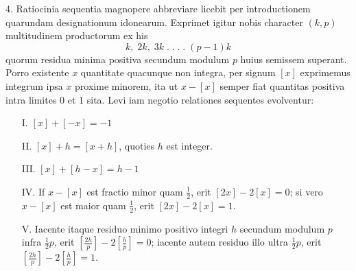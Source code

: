 \documentclass[14pt]{memoir}
\begin{document}
4. 
Ratiocinia sequentia magnopere abbreviare licebit per introductionem quarundam designationum idonearum. Exprimet igitur nobis character \((k, p)\) multitudinem productorum ex his 
\[ k,\;2k,\;3k\;.\;.\;.\;.\;(p-1)k \]
quorum residua minima positiva secundum modulum \(p\) huius semissem superant. Porro existente \(x\) quantitate quacunque non integra, per signum \([x]\) exprimemus integrum ipsa \(x\) proxime minorem, ita ut \(x-[x]\) semper fiat quantitas positiva intra limites \(0\) et \(1\) sita. Levi iam negotio relationes sequentes evolventur: 
\begin{enumerate}[itemsep=0em]
\item[I.] \([x] + [-x] = -1\) 
\item[II.] \([x] + h = [x+h]\), quoties \(h\) est integer.
\item[III.] \([x] + [h-x] = h-1\)
\item[IV.] If \(x-[x]\) est fractio minor quam \(\tfrac{1}{2}\), erit \([2x]-2[x]=0\); si vero \(x-[x]\) est maior quam \(\tfrac{1}{2}\), erit $[2x]-2[x]=1$.
\item[V.] Iacente itaque residuo minimo positivo integri \(h\) secundum modulum \(p\) infra \(\tfrac{1}{2}p\), erit \(\left[\tfrac{2h}{p}\right]-2\left[\tfrac{h}{p}\right] = 0\); iacente autem residuo illo ultra \(\tfrac{1}{2} p\), erit \(\left[\tfrac{2h}{p}\right]-2\left[\tfrac{h}{p}\right] = 1\).
\end{enumerate}%
\end{document}
